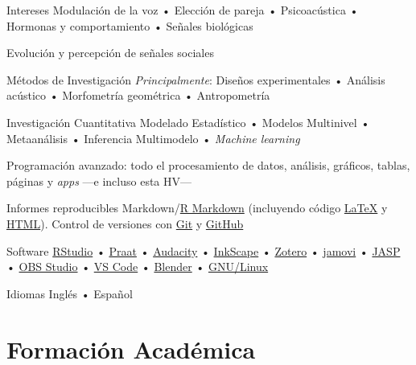 \documentclass[11pt,a4paper,]{awesome-cv}
\begin{document}
\begin{footnotesize}
\begin{cvskills}
  \cvskill
    {Intereses}
    {Modulación de la voz • Elección de pareja • Psicoacústica • Hormonas y comportamiento • Señales biológicas}
    
  \cvskill
    {}
    {Evolución y percepción de señales sociales}
    
  \cvskill
    {Métodos de Investigación}
    {\textit{Principalmente}: Diseños experimentales • Análisis acústico • Morfometría geométrica • Antropometría}

  \cvskill
    {Investigación Cuantitativa}
    {Modelado Estadístico • Modelos Multinivel • Metaanálisis • Inferencia Multimodelo • \textit{Machine learning}}
  
  \cvskill
    {Programación}
    {\href{https://www.r-project.org/}{\faRProject} avanzado: todo el procesamiento de datos, análisis, gráficos, tablas, páginas y \textit{apps} —e incluso esta HV—}

  \cvskill
    {Informes reproducibles}
    {Markdown/\href{https://rmarkdown.rstudio.com/}{R Markdown} (incluyendo código  \href{https://www.latex-project.org/}{{\selectfont\LaTeX}} y \href{https://html.spec.whatwg.org/}{HTML}). Control de versiones con  \href{https://git-scm.com/}{Git} \faGit* y \href{https://github.com/JDLeongomez}{GitHub} \faGithub}

  \cvskill
    {Software}
    {\href{https://posit.co/products/open-source/rstudio/}{RStudio} •  \href{https://www.fon.hum.uva.nl/praat/}{Praat} • \href{https://www.audacityteam.org/}{Audacity} •  \href{https://inkscape.org/}{InkScape} • \href{https://www.zotero.org/}{Zotero} •  \href{https://www.jamovi.org/}{jamovi} • \href{https://jasp-stats.org/}{JASP} •  \href{https://obsproject.com/}{OBS Studio} • \href{https://code.visualstudio.com/}{VS Code} • \href{https://www.blender.org/}{Blender} • \href{https://www.gnu.org/}{GNU/Linux} \faLinux}

  \cvskill
    {Idiomas}
    {Inglés • Español}
\end{cvskills}

\end{footnotesize}

\hypertarget{formaciuxf3n-acaduxe9mica}{%
\section{Formación Académica}\label{formaciuxf3n-acaduxe9mica}}
\end{document}
